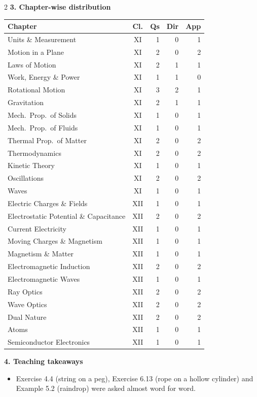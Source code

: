 \begin{multicols}{2}
\columnbreak
\textbf{\color{crimson}3. Chapter-wise distribution}\par\smallskip
{\footnotesize\begin{tabular}{@{}p{4.7cm}c@{\,}r@{\,}r@{\,}r@{}}\toprule
Chapter & Cl. & Qs & Dir & App\\\midrule
Units \& Measurement & XI & 1 & 0 & 1\\
Motion in a Plane & XI & 2 & 0 & 2\\
Laws of Motion & XI & 2 & 1 & 1\\
Work, Energy \& Power & XI & 1 & 1 & 0\\
Rotational Motion & XI & 3 & 2 & 1\\
Gravitation & XI & 2 & 1 & 1\\
Mech.\ Prop.\ of Solids & XI & 1 & 0 & 1\\
Mech.\ Prop.\ of Fluids & XI & 1 & 0 & 1\\
Thermal Prop.\ of Matter & XI & 2 & 0 & 2\\
Thermodynamics & XI & 2 & 0 & 2\\
Kinetic Theory & XI & 1 & 0 & 1\\
Oscillations & XI & 2 & 0 & 2\\
Waves & XI & 1 & 0 & 1\\
Electric Charges \& Fields & XII & 1 & 0 & 1\\
Electrostatic Potential \& Capacitance & XII & 2 & 0 & 2\\
Current Electricity & XII & 1 & 0 & 1\\
Moving Charges \& Magnetism & XII & 1 & 0 & 1\\
Magnetism \& Matter & XII & 1 & 0 & 1\\
Electromagnetic Induction & XII & 2 & 0 & 2\\
Electromagnetic Waves & XII & 1 & 0 & 1\\
Ray Optics & XII & 2 & 0 & 2\\
Wave Optics & XII & 2 & 0 & 2\\
Dual Nature & XII & 2 & 0 & 2\\
Atoms & XII & 1 & 0 & 1\\
Semiconductor Electronics & XII & 1 & 0 & 1\\
\bottomrule\end{tabular}}\par\medskip
\textbf{\color{crimson}4. Teaching takeaways}\par\smallskip
{\footnotesize\begin{itemize}[leftmargin=1em,nosep]
\item Exercise 4.4 (string on a peg), Exercise 6.13 (rope on a hollow cylinder) and Example 5.2 (raindrop) were asked almost word for word.

\end{itemize}}
\end{multicols}
